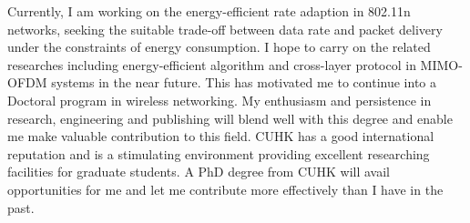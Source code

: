 \documentclass[conference,onecolumn]{IEEEtran}
\begin{document}
Currently, I am working on the energy-efficient rate adaption in 802.11n networks, seeking the suitable trade-off between data rate and packet delivery under the constraints of energy consumption. I hope to carry on the related researches including energy-efficient algorithm and cross-layer protocol in MIMO-OFDM systems in the near future. This has motivated me to continue into a Doctoral program in wireless networking. My enthusiasm and persistence in research, engineering and publishing will blend well with this degree and enable me make valuable contribution to this field. CUHK has a good international reputation and is a stimulating environment providing excellent researching facilities for graduate students. A PhD degree from CUHK will avail opportunities for me and let me contribute more effectively than I have in the past.
\end{document}
